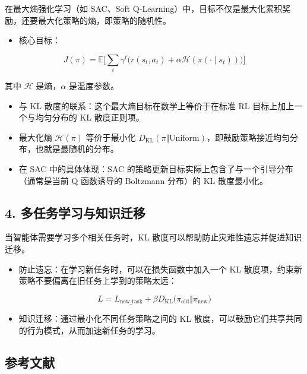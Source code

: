 在最大熵强化学习（如 SAC、Soft Q-Learning）中，目标不仅是最大化累积奖励，还要最大化策略的熵，即策略的随机性。

\begin{itemize}
\tightlist
\item
  核心目标：
\end{itemize}

\[
J(\pi)
=
\mathbb{E}
\bigl[
\sum_t \gamma^{t}
\bigl(
r(s_t,a_t)+\alpha\mathcal{H}(\pi(\cdot\mid s_t))
\bigr)
\bigr]
\]

其中 \(\mathcal{H}\) 是熵，\(\alpha\) 是温度参数。

\begin{itemize}
\tightlist
\item
  与 KL 散度的联系：这个最大熵目标在数学上等价于在标准 RL 目标上加上一个与均匀分布的 KL 散度正则项。
\item
  最大化熵 \(\mathcal{H}(\pi)\) 等价于最小化 \(D_{\mathrm{KL}}(\pi\Vert\mathrm{Uniform})\)，即鼓励策略接近均匀分布，也就是最随机的分布。
\item
  在 SAC 中的具体体现：SAC 的策略更新目标实际上包含了与一个引导分布（通常是当前 Q 函数诱导的 Boltzmann 分布）的 KL 散度最小化。
\end{itemize}

\hypertarget{ux591aux4efbux52a1ux5b66ux4e60ux4e0eux77e5ux8bc6ux8fc1ux79fb}{%
\subsection{4. 多任务学习与知识迁移}\label{ux591aux4efbux52a1ux5b66ux4e60ux4e0eux77e5ux8bc6ux8fc1ux79fb}}

当智能体需要学习多个相关任务时，KL 散度可以帮助防止灾难性遗忘并促进知识迁移。

\begin{itemize}
\tightlist
\item
  防止遗忘：在学习新任务时，可以在损失函数中加入一个 KL 散度项，约束新策略不要偏离在旧任务上学到的策略太远：
\end{itemize}

\[
L
=
L_{\mathrm{new\_task}}
+
\beta D_{\mathrm{KL}}\bigl(
\pi_{\mathrm{old}}
\Vert
\pi_{\mathrm{new}}
\bigr)
\]

\begin{itemize}
\tightlist
\item
  知识迁移：通过最小化不同任务策略之间的 KL 散度，可以鼓励它们共享共同的行为模式，从而加速新任务的学习。
\end{itemize}

\hypertarget{ux53c2ux8003ux6587ux732e-57}{%
\subsection{参考文献}\label{ux53c2ux8003ux6587ux732e-57}}


